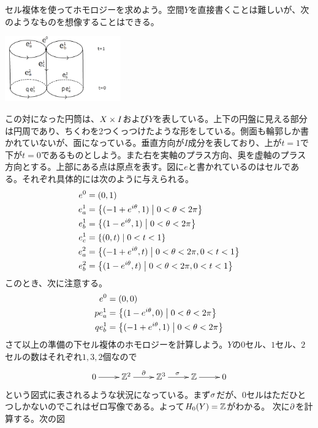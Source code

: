 \begin{sol}

セル複体を使ってホモロジーを求めよう。空間$Y$を直接書くことは難しいが、次のようなものを想像することはできる。

\begin{center}
\includegraphics[width=5cm]{H31expert05_01.png}
\end{center}

この対になった円筒は、$X \times I$および$Y$を表している。上下の円盤に見える部分は円周であり、ちくわを2つくっつけたような形をしている。側面も輪郭しか書かれていないが、面になっている。垂直方向が$I$成分を表しており、上が$t=1$で下が$t=0$であるものとしよう。また右を実軸のプラス方向、奥を虚軸のプラス方向とする。上部にある点は原点を表す。図に$e$と書かれているのはセルである。それぞれ具体的には次のように与えられる。
\begin{align*}
  e^0 &= (0,1) \\
  e^1_a &= \left\{  (-1+e^{i{\theta}},1)  \mathrel{} \middle| \mathrel{} 0 < {\theta} < 2\pi  \right\} \\
  e^1_b &= \left\{  (1-e^{i{\theta}},1)  \mathrel{} \middle| \mathrel{} 0 < {\theta} < 2\pi  \right\} \\
  e^1_c &= \left\{  (0,t)  \mathrel{} \middle| \mathrel{} 0 < t < 1  \right\} \\
  e^2_a &= \left\{  (-1+e^{i{\theta}},t)  \mathrel{} \middle| \mathrel{} 0 < {\theta} < 2\pi , 0 < t < 1  \right\} \\
  e^2_b &= \left\{  (1-e^{i{\theta}},t)  \mathrel{} \middle| \mathrel{} 0 < {\theta} < 2\pi , 0 < t < 1  \right\}
\end{align*}
このとき、次に注意する。
\begin{align*}
  e^0 &= (0,0) \\
  pe_a^1 &= \left\{  (1-e^{i{\theta}},0)  \mathrel{} \middle| \mathrel{} 0 < {\theta} < 2\pi  \right\} \\
  qe_b^1 &= \left\{  (-1+e^{i{\theta}},1)  \mathrel{} \middle| \mathrel{} 0 < {\theta} < 2\pi  \right\}
\end{align*}
さて以上の準備の下セル複体のホモロジーを計算しよう。$Y$の$0$セル、$1$セル、$2$セルの数はそれぞれ$1,3,2$個なので
\[
\xymatrix{
0 \ar[r] & \Z^2 \ar[r]^{\del} & \Z^3 \ar[r]^{\grs} & \Z \ar[r] & 0
}
\]
という図式に表されるような状況になっている。まず${\sigma}$だが、$0$セルはただひとつしかないのでこれはゼロ写像である。よって$H_0(Y)={\mathbb Z}$がわかる。
次に$\partial$を計算する。次の図


\end{sol}
